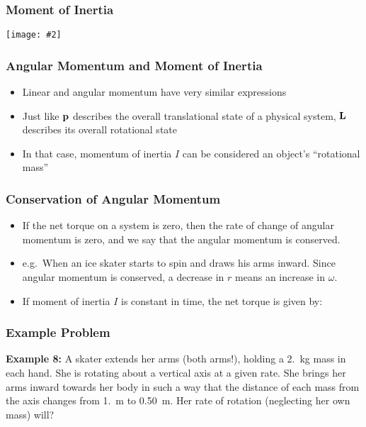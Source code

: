 \documentclass[12pt,compress,aspectratio=169]{beamer}
\newcommand{\pic}[2]{\texttt{[image: \#2]}}
\newcommand{\mb}[1]{\ensuremath\mathbf{#1}}
\newcommand{\eq}[2]{\vspace{#1}{\Large\begin{displaymath}#2\end{displaymath}}}
\begin{document}
\begin{frame}
  \frametitle{Moment of Inertia}
  \begin{center}
    \pic{.7}{mic.png}
  \end{center}
\end{frame}

\begin{frame}
  \frametitle{Angular Momentum and Moment of Inertia}
  \begin{itemize}
  \item Linear and angular momentum have very similar expressions
    
    \eq{-.25in}{
      \mb{p}=m\mb{v}\quad\quad\quad \mb{L}=I\bm{\omega}
    }
  \item Just like $\mb{p}$ describes the overall translational state of a
    physical system, $\mb{L}$ describes its overall rotational state
  \item In that case, momentum of inertia $I$ can be considered an object's
    ``rotational mass''
  \end{itemize}
\end{frame}



\begin{frame}
  \frametitle{Conservation of Angular Momentum}

  \eq{-.35in}{
    \bm{\tau}=\mb{r}\times\mb{F}=\mb{r}\times\frac{d\mb{p}}{dt}
    =\frac{d(\mb{r}\times\mb{p})}{dt}\;\;\longrightarrow\;\;
    \boxed{\bm{\tau} =\frac{d\mb{L}}{dt}}
  }
  \begin{itemize}
  \item If the net torque on a system is zero, then the rate of change
    of angular momentum is zero, and we say that the angular momentum is
    conserved. 
  \item e.g.\ When an ice skater starts to spin and draws his arms inward.
    Since angular momentum is conserved, a decrease in $r$ means an
    increase in $\omega$.
  \item If moment of inertia $I$ is constant in time, the net torque is given
    by:

    \eq{-.2in}{
      \boxed{\bm{\tau}=I\bm{\alpha}}
    }
  \end{itemize}
\end{frame}


\begin{frame}
  \frametitle{Example Problem}
  \textbf{Example 8:} A skater extends her arms (both arms!), holding a
  \SI{2.}{\kg} mass in each hand. She is rotating about a vertical axis at a
  given rate. She brings her arms inward towards her body in such a way that
  the distance of each mass from the axis changes from \SI{1.}{\metre} to
  \SI{.50}{\metre}. Her rate of rotation (neglecting her own mass) will?
\end{frame}
\end{document}
